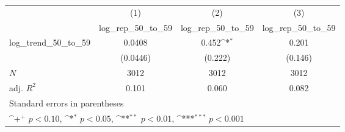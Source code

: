 {
\def\sym#1{\ifmmode^{#1}\else\(^{#1}\)\fi}
\begin{tabular}{l*{3}{c}}
\hline\hline
            &\multicolumn{1}{c}{(1)}&\multicolumn{1}{c}{(2)}&\multicolumn{1}{c}{(3)}\\
            &\multicolumn{1}{c}{log\_rep\_50\_to\_59}&\multicolumn{1}{c}{log\_rep\_50\_to\_59}&\multicolumn{1}{c}{log\_rep\_50\_to\_59}\\
\hline
log\_trend\_50\_to\_59&      0.0408         &       0.452\sym{*}  &       0.201         \\
            &    (0.0446)         &     (0.222)         &     (0.146)         \\
\hline
\(N\)       &        3012         &        3012         &        3012         \\
adj. \(R^{2}\)&       0.101         &       0.060         &       0.082         \\
\hline\hline
\multicolumn{4}{l}{\footnotesize Standard errors in parentheses}\\
\multicolumn{4}{l}{\footnotesize \sym{+} \(p<0.10\), \sym{*} \(p<0.05\), \sym{**} \(p<0.01\), \sym{***} \(p<0.001\)}\\
\end{tabular}
}
